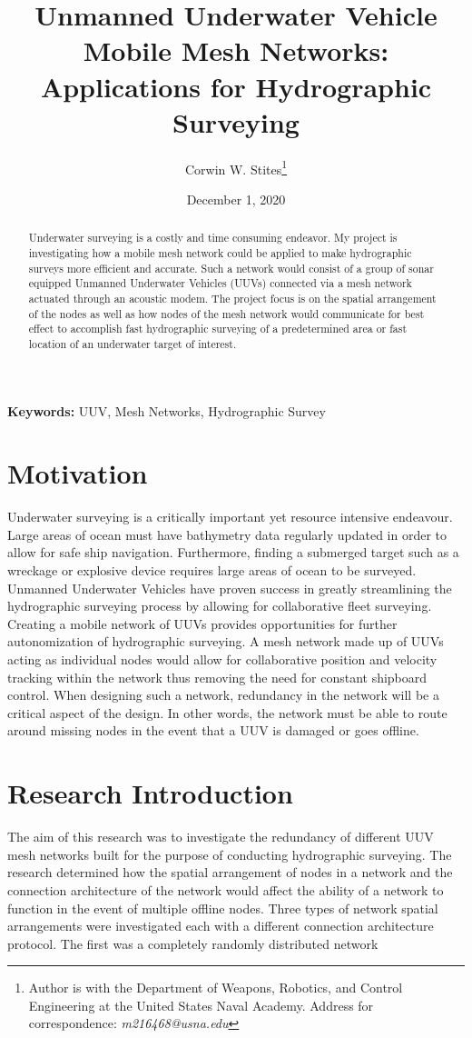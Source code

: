 \documentclass[10pt]{article}
\title{Unmanned Underwater Vehicle Mobile Mesh Networks: Applications for Hydrographic Surveying}
\author{Corwin W. Stites\thanks{Author is with the Department of Weapons, Robotics, and Control Engineering at the United States Naval Academy. Address for correspondence: \emph{m216468@usna.edu}}}
\date{December 1, 2020}
\begin{document}
\maketitle

\begin{abstract}
	Underwater surveying is a costly and time consuming endeavor. My project is investigating how a mobile mesh network could be applied to make hydrographic surveys more efficient and accurate. Such a network would consist of a group of sonar equipped Unmanned Underwater Vehicles (UUVs) connected via a mesh network actuated through an acoustic modem. The project focus is on the spatial arrangement of the nodes as well as how nodes of the mesh network would communicate for best effect to accomplish fast hydrographic surveying of a predetermined area or fast location of an underwater target of interest.  
\end{abstract}

{\scriptsize\textbf{Keywords: } UUV, Mesh Networks, Hydrographic Survey}

\section{Motivation}
Underwater surveying is a critically important yet resource intensive endeavour. Large areas of ocean must have bathymetry data regularly updated in order to allow for safe ship navigation. Furthermore, finding a submerged target such as a wreckage or explosive device  requires large areas of ocean to be surveyed. Unmanned Underwater Vehicles have proven success in greatly streamlining the hydrographic surveying process by allowing for collaborative fleet surveying. Creating a mobile network of UUVs provides opportunities for further autonomization of hydrographic surveying.  A mesh network made up of UUVs acting as individual nodes would allow for collaborative position and velocity tracking within the network thus removing the need for constant shipboard control. When designing such a network, redundancy in the network will be a critical aspect of the design. In other words, the network must be able to route around missing nodes in the event that a UUV is damaged or goes offline.


\section{Research Introduction}
The aim of this research was to investigate the redundancy of different UUV mesh networks built for the purpose of conducting hydrographic surveying. The research determined how the spatial arrangement of nodes in a network and the connection architecture of the network would affect the ability of a network to function in the event of multiple offline nodes. Three types of network spatial arrangements were investigated each with a different connection architecture protocol. The first was a completely randomly distributed network 
\end{document}

